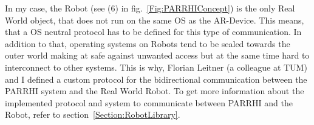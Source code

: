 In my case, the Robot (see (6) in fig.~\ref{Fig:PARRHIConcept}) is the only Real World object, that does not run on the same OS as the AR-Device. This means, that a OS neutral protocol has to be defined for this type of communication. In addition to that, operating systems on Robots tend to be sealed towards the outer world making at safe against unwanted access but at the same time hard to interconnect to other systems. This is why, Florian Leitner (a colleague at TUM) and I defined a custom protocol for the bidirectional communication between the PARRHI system and the Real World Robot. To get more information about the implemented protocol and system to communicate between PARRHI and the Robot, refer to section~\ref{Section:RobotLibrary}.


























